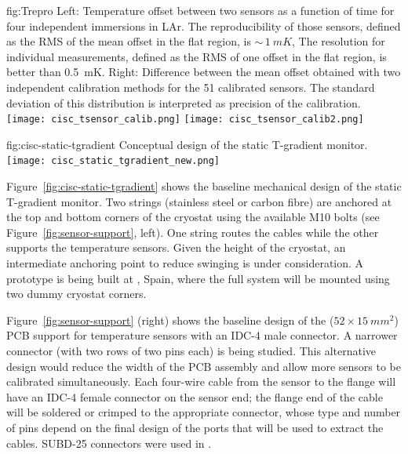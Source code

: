 \begin{dunefigure}{fig:Trepro}{
 Left:   Temperature offset between two sensors as a function of time for four independent immersions in LAr. The reproducibility of those sensors, defined as the RMS of the mean offset in the flat region, is $\sim\,\SI{1}{mK}$,
    The resolution for individual measurements, defined as the RMS of one offset in the flat region, is better than \SI{0.5}{mK}. Right: Difference between the mean offset obtained with two independent calibration methods for the 51 calibrated sensors. The standard deviation of this distribution is interpreted as precision of the calibration.}
  \texttt{[image: cisc\_tsensor\_calib.png]}%
  \texttt{[image: cisc\_tsensor\_calib2.png]}%
\end{dunefigure}


\begin{dunefigure}
{fig:cisc-static-tgradient}
  {Conceptual design of the static T-gradient monitor.}
  \texttt{[image: cisc\_static\_tgradient\_new.png]}
\end{dunefigure}

Figure~\ref{fig:cisc-static-tgradient} shows the baseline mechanical design of
the static T-gradient monitor. Two strings (stainless steel or carbon fibre) are anchored at the top and bottom corners of the cryostat using the available M10 bolts (see Figure~\ref{fig:sensor-support}, left). One string routes the cables while the other supports the temperature sensors.
Given the height of the cryostat, an intermediate anchoring point to reduce swinging is under consideration. 
A prototype is being built at , Spain, where the full system will be mounted using two dummy cryostat corners.   


Figure~\ref{fig:sensor-support} (right) shows the baseline design of the ($52\times \SI{15}{mm^2}$) PCB support for temperature sensors with an IDC-4 male connector. A narrower connector (with two rows of two pins each) is being studied. This alternative design would reduce the width of the PCB assembly and allow more sensors to be calibrated simultaneously. Each four-wire cable from the sensor to the flange will have an IDC-4 female connector on the sensor end; the flange end of the cable will be soldered or crimped to the appropriate connector, whose type and number of pins  depend on the final design of the  ports that will be used to extract the cables. SUBD-25 connectors were used in .


